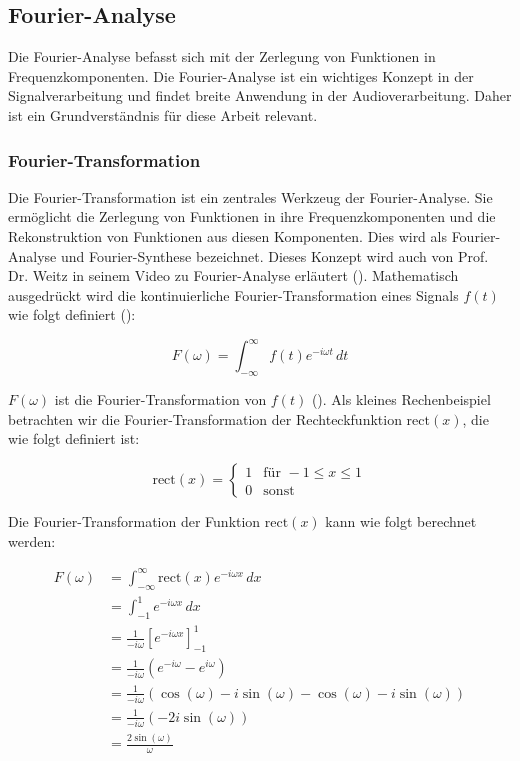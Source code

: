 \documentclass[11pt,a4paper]{article}
\begin{document}
\newpage \subsection{Fourier-Analyse}
Die Fourier-Analyse befasst sich mit der Zerlegung von Funktionen in Frequenzkomponenten. Die
Fourier-Analyse ist ein wichtiges Konzept in der Signalverarbeitung und findet breite Anwendung
in der Audioverarbeitung. Daher ist ein Grundverständnis für diese Arbeit relevant.

\subsubsection{Fourier-Transformation}
Die Fourier-Transformation ist ein zentrales Werkzeug der Fourier-Analyse. Sie ermöglicht die
Zerlegung von Funktionen in ihre Frequenzkomponenten und die Rekonstruktion von Funktionen aus
diesen Komponenten. Dies wird als Fourier-Analyse und Fourier-Synthese bezeichnet. Dieses Konzept
wird auch von Prof. Dr. Weitz in seinem Video zu Fourier-Analyse erläutert
(\cite[2:20]{weitz2023fourier}). Mathematisch ausgedrückt wird die kontinuierliche
Fourier-Transformation eines Signals \( f(t) \) wie folgt definiert
(\cite[Chapter~5]{hansen2014fourier}):

\begin{equation*}
	F(\omega) = \int_{-\infty}^{\infty} f(t) e^{-i \omega t} \, dt
	\label{eq:fourier_transform}
\end{equation*}

\noindent
\(F(\omega)\) ist die Fourier-Transformation von \(f(t)\)
(\cite[49:27]{weitz2023fourier}). Als kleines Rechenbeispiel betrachten wir die
Fourier-Transformation der Rechteckfunktion \( \text{rect}(x) \), die wie folgt definiert ist:

\[
	\text{rect}(x) =
	\begin{cases}
		1 & \text{für } -1 \leq x \leq 1 \\
		0 & \text{sonst}
	\end{cases}
\]

\noindent
Die Fourier-Transformation der Funktion \( \text{rect}(x) \) kann wie folgt berechnet werden:

\begin{equation*}
	\begin{split}
		F(\omega) &= \int_{-\infty}^{\infty} \text{rect}(x) e^{-i \omega x} \, dx \\
		&= \int_{-1}^{1} e^{-i \omega x} \, dx \\
		&= \frac{1}{-i \omega} \left[ e^{-i \omega x} \right]_{-1}^{1} \\
		&= \frac{1}{-i \omega} \left( e^{-i \omega} - e^{i \omega} \right) \\
		&= \frac{1}{-i \omega} \left( \cos(\omega) - i \sin(\omega) - \cos(\omega) - i \sin(\omega) \right) \\
		&= \frac{1}{-i \omega} \left( -2 i \sin(\omega) \right) \\
		&= \frac{2 \sin(\omega)}{\omega}
	\end{split}
\end{equation*}
\noindent
\end{document}
